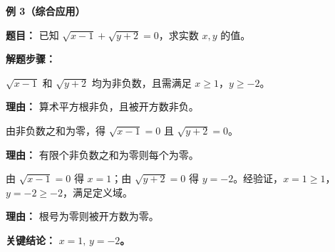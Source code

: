 \begin{examplebox}
	\medskip
	\textbf{\textcolor{CExample}{例 3（综合应用）}}

	\textbf{\textcolor{CExample}{题目：}} 已知 $\sqrt{x-1}+\sqrt{y+2}=0$，求实数 $x,y$ 的值。

	\textbf{\textcolor{CExample}{解题步骤：}}
	\begin{description}[style=nextline, leftmargin=2.8em, labelsep=0.5em, itemsep=0.45em]
		\item[\textbf{第一步（识别非负项）：}]
		      $\sqrt{x-1}$ 和 $\sqrt{y+2}$ 均为非负数，且需满足 $x\ge1$，$y\ge-2$。
		      \par\textbf{理由：} 算术平方根非负，且被开方数非负。
		\item[\textbf{第二步（套用结论）：}]
		      由非负数之和为零，得 $\sqrt{x-1}=0$ 且 $\sqrt{y+2}=0$。
		      \par\textbf{理由：} 有限个非负数之和为零则每个为零。
		\item[\textbf{第三步（求解验证）：}]
		      由 $\sqrt{x-1}=0$ 得 $x=1$；由 $\sqrt{y+2}=0$ 得 $y=-2$。经验证，$x=1\ge1$，$y=-2\ge-2$，满足定义域。
		      \par\textbf{理由：} 根号为零则被开方数为零。
	\end{description}

	\textbf{\textcolor{CExample}{关键结论：}} \textbf{$x=1,\,y=-2$。}
\end{examplebox}